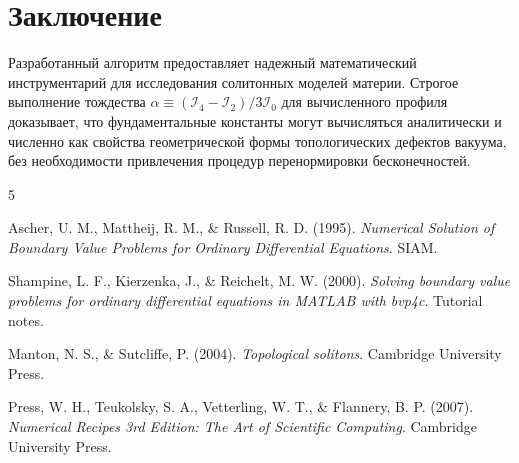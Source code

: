 \documentclass[12pt,a4paper]{article}
\begin{document}
\section{Заключение}
Разработанный алгоритм предоставляет надежный математический инструментарий для исследования солитонных моделей материи. Строгое выполнение тождества $\alpha \equiv (\mathcal{I}_4 - \mathcal{I}_2) / 3\mathcal{I}_0$ для вычисленного профиля доказывает, что фундаментальные константы могут вычисляться аналитически и численно как свойства геометрической формы топологических дефектов вакуума, без необходимости привлечения процедур перенормировки бесконечностей.

\begin{thebibliography}{5}

Ascher, U. M., Mattheij, R. M., \& Russell, R. D. (1995). \textit{Numerical Solution of Boundary Value Problems for Ordinary Differential Equations}. SIAM.

Shampine, L. F., Kierzenka, J., \& Reichelt, M. W. (2000). \textit{Solving boundary value problems for ordinary differential equations in MATLAB with bvp4c}. Tutorial notes.

Manton, N. S., \& Sutcliffe, P. (2004). \textit{Topological solitons}. Cambridge University Press.

Press, W. H., Teukolsky, S. A., Vetterling, W. T., \& Flannery, B. P. (2007). \textit{Numerical Recipes 3rd Edition: The Art of Scientific Computing}. Cambridge University Press.

\end{thebibliography}
\end{document}
